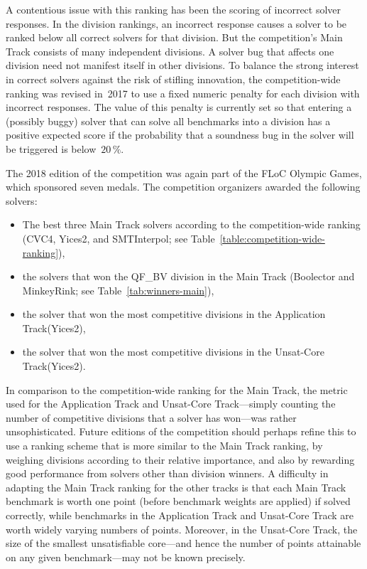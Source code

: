 \documentclass[dvipsnames,table,twoside,11pt]{article}
\newcommand{\maintrack}{Main Track\xspace}
\newcommand{\apptrack}{Application Track\xspace}
\newcommand{\ucoretrack}{Unsat-Core Track\xspace}
\begin{document}
A contentious issue with this ranking has been the scoring of
incorrect solver responses.  In the division rankings, an incorrect
response causes a solver to be ranked below all correct solvers for
that division.  But the competition's \maintrack consists of many
independent divisions.  A solver bug that affects one division need
not manifest itself in other divisions.  To balance the strong
interest in correct solvers against the risk of stifling innovation,
the competition-wide ranking was revised in~2017 to use a fixed
numeric penalty for each division with incorrect responses.  The value
of this penalty is currently set so that entering a (possibly buggy)
solver that can solve all benchmarks into a division has a positive
expected score if the probability that a soundness bug in the solver
will be triggered is below~$20\,\%$.~\cite{rules18}

The 2018 edition of the competition was again part of the FLoC Olympic
Games, which sponsored seven medals.  The competition organizers
awarded the following solvers:
\begin{itemize}
\item The best three \maintrack solvers according to the
  competition-wide ranking (CVC4, Yices2, and SMTInterpol; see
  Table~\ref{table:competition-wide-ranking}),
\item the solvers that won the QF\_BV division in the \maintrack
  (Boolector and MinkeyRink; see Table~\ref{tab:winners-main}),
\item the solver that won the most competitive divisions in the
  \apptrack (Yices2),
\item the solver that won the most competitive divisions in the
  \ucoretrack (Yices2).
\end{itemize}

In comparison to the competition-wide ranking for the \maintrack, the
metric used for the \apptrack and \ucoretrack---simply counting
the number of competitive divisions that a solver has won---was rather
unsophisticated.  Future editions of the competition should perhaps
refine this to use a ranking scheme that is more similar to the
\maintrack ranking, by weighing divisions according to their relative
importance, and also by rewarding good performance from solvers other
than division winners.  A difficulty in adapting the \maintrack
ranking for the other tracks is that each \maintrack benchmark is
worth one point (before benchmark weights are applied) if solved
correctly, while benchmarks in the \apptrack and \ucoretrack
are worth widely varying numbers of points.  Moreover, in the
\ucoretrack, the size of the smallest unsatisfiable core---and
hence the number of points attainable on any given benchmark---may not
be known precisely.
\end{document}
